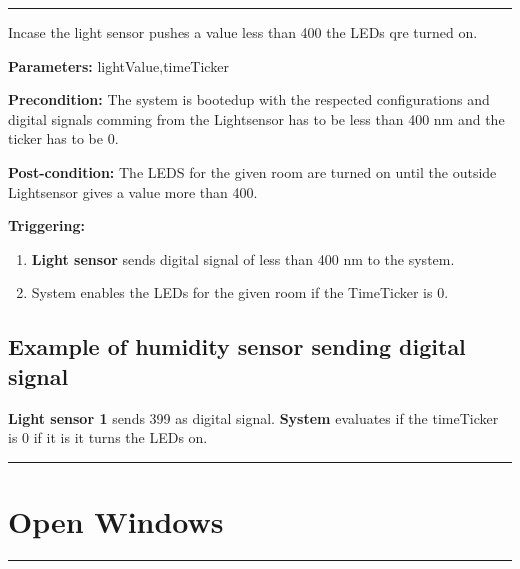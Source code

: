 \hrule
\hfill
\vspace{0.5cm}
\label{operation:Turn on LED}

Incase the light sensor pushes a value less than 400 the LEDs qre turned on.
\begin{description}
\item \textbf{Parameters:} lightValue,timeTicker
\item \textbf{Precondition:} The system is bootedup with the respected
configurations and digital signals comming from the Lightsensor has to be less
than 400 nm and the ticker has to be 0.
\item \textbf{Post-condition:} The LEDS for the given room are turned on until
the outside Lightsensor gives a value more than 400.

\item \textbf{Triggering:}
\begin{enumerate}
\item \textbf{Light sensor} sends digital signal of less than 400 nm to the
system.
\item System enables the LEDs for the given room if the TimeTicker is 0.
\end{enumerate}
\end{description}

\subsection{Example of humidity sensor sending digital signal}
\textbf{Light sensor 1} sends 399 as digital signal. \textbf{System}
evaluates if the timeTicker is 0 if it is it turns the LEDs on.
\hfill
\vspace{0.5cm}
\hrule




\break




\section{Open Windows}

\hrule
\hfill
\vspace{0.5cm}
\label{operation:Open Windows}

